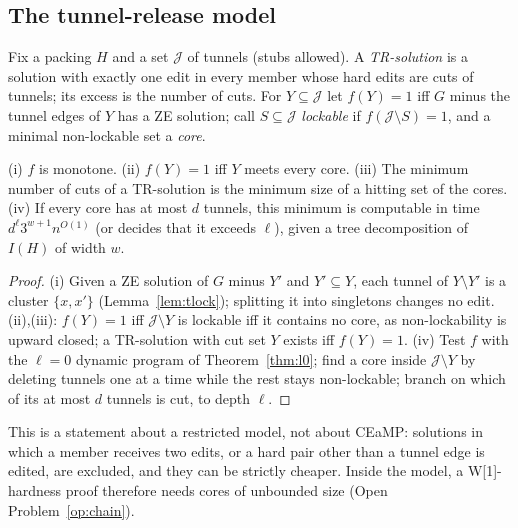 \subsection{The tunnel-release model}
Fix a packing $H$ and a set $\mathcal J$ of tunnels (stubs allowed). A \emph{TR-solution} is a solution with exactly one edit in every member whose hard edits are cuts of tunnels; its excess is the number of cuts. For $Y\subseteq\mathcal J$ let $f(Y)=1$ iff $G$ minus the tunnel edges of $Y$ has a ZE solution; call $S\subseteq\mathcal J$ \emph{lockable} if $f(\mathcal J\setminus S)=1$, and a minimal non-lockable set a \emph{core}.
\begin{proposition}\label{prop:tTR}
(i) $f$ is monotone. (ii) $f(Y)=1$ iff $Y$ meets every core. (iii) The minimum number of cuts of a TR-solution is the minimum size of a hitting set of the cores. (iv) If every core has at most $d$ tunnels, this minimum is computable in time $d^{\ell}3^{w+1}n^{O(1)}$ (or decides that it exceeds $\ell$), given a tree decomposition of $I(H)$ of width $w$.
\end{proposition}
\begin{proof}
(i) Given a ZE solution of $G$ minus $Y'$ and $Y'\subseteq Y$, each tunnel of $Y\setminus Y'$ is a cluster $\{x,x'\}$ (Lemma~\ref{lem:tlock}); splitting it into singletons changes no edit. (ii),(iii): $f(Y)=1$ iff $\mathcal J\setminus Y$ is lockable iff it contains no core, as non-lockability is upward closed; a TR-solution with cut set $Y$ exists iff $f(Y)=1$. (iv) Test $f$ with the $\ell=0$ dynamic program of Theorem~\ref{thm:l0}; find a core inside $\mathcal J\setminus Y$ by deleting tunnels one at a time while the rest stays non-lockable; branch on which of its at most $d$ tunnels is cut, to depth $\ell$.
\end{proof}
This is a statement about a restricted model, not about CEaMP: solutions in which a member receives two edits, or a hard pair other than a tunnel edge is edited, are excluded, and they can be strictly cheaper. Inside the model, a W[1]-hardness proof therefore needs cores of unbounded size (Open Problem~\ref{op:chain}).


